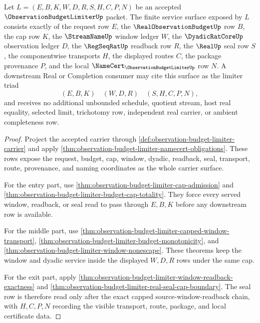 \begin{theorem}
\label{thm:observation-budget-limiter-finite-service-triad}
Let $L=(E,B,K,W,D,R,S,H,C,P,N)$ be an accepted $\ObservationBudgetLimiterUp$ packet. The finite service surface exposed by $L$ consists exactly of the request row $E$, the $\RealObservationBudgetUp$ row $B$, the cap row $K$, the $\StreamNameUp$ window ledger $W$, the $\DyadicRatCoreUp$ observation ledger $D$, the $\RegSeqRatUp$ readback row $R$, the $\RealUp$ seal row $S$, the componentwise transports $H$, the displayed routes $C$, the package provenance $P$, and the local $\NameCert_{\ObservationBudgetLimiterUp}$ row $N$. A downstream Real or Completion consumer may cite this surface as the limiter triad
$$
(E,B,K) \quad (W,D,R) \quad (S,H,C,P,N),
$$
and receives no additional unbounded schedule, quotient stream, host real equality, selected limit, trichotomy row, independent real carrier, or ambient completeness row.
\end{theorem}
\begin{proof}
Project the accepted carrier through \autoref{def:observation-budget-limiter-carrier} and apply \autoref{thm:observation-budget-limiter-namecert-obligations}. These rows expose the request, budget, cap, window, dyadic, readback, seal, transport, route, provenance, and naming coordinates as the whole carrier surface.

For the entry part, use \autoref{thm:observation-budget-limiter-cap-admission} and \autoref{thm:observation-budget-limiter-budget-cap-totality}. They force every served window, readback, or seal read to pass through $E,B,K$ before any downstream row is available.

For the middle part, use \autoref{thm:observation-budget-limiter-capped-window-transport}, \autoref{thm:observation-budget-limiter-budget-monotonicity}, and \autoref{thm:observation-budget-limiter-window-nonescape}. These theorems keep the window and dyadic service inside the displayed $W,D,R$ rows under the same cap.

For the exit part, apply \autoref{thm:observation-budget-limiter-window-readback-exactness} and \autoref{thm:observation-budget-limiter-real-seal-cap-boundary}. The seal row is therefore read only after the exact capped source-window-readback chain, with $H,C,P,N$ recording the visible transport, route, package, and local certificate data.
\end{proof}

